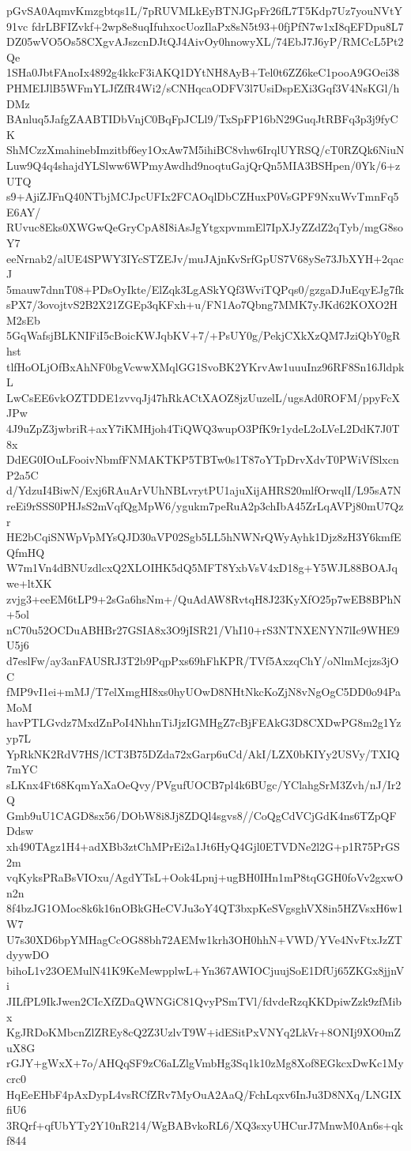 pGvSA0AqmvKmzgbtqs1L/7pRUVMLkEyBTNJGpFr26fL7T5Kdp7Uz7youNVtY91vc
fdrLBFIZvkf+2wp8e8uqIfuhxocUozIlaPx8sN5t93+0fjPfN7w1xI8qEFDpu8L7
DZ05wVO5Os58CXgvAJszcnDJtQJ4AivOy0hnowyXL/74EbJ7J6yP/RMCcL5Pt2Qe
1SHa0JbtFAnoIx4892g4kkcF3iAKQ1DYtNH8AyB+Tel0t6ZZ6keC1pooA9GOei38
PHMEIJlB5WFmYLJfZfR4Wi2/sCNHqcaODFV3l7UsiDspEXi3Gqf3V4NsKGl/hDMz
BAnluq5JafgZAABTIDbVnjC0BqFpJCLl9/TxSpFP16bN29GuqJtRBFq3p3j9fyCK
ShMCzzXmahinebImzitbf6ey1OxAw7M5ihiBC8vhw6IrqlUYRSQ/cT0RZQk6NiuN
Luw9Q4q4shajdYLSlww6WPmyAwdhd9noqtuGajQrQn5MIA3BSHpen/0Yk/6+zUTQ
s9+AjiZJFnQ40NTbjMCJpcUFIx2FCAOqlDbCZHuxP0VsGPF9NxuWvTmnFq5E6AY/
RUvuc8Eks0XWGwQeGryCpA8I8iAsJgYtgxpvmmEl7IpXJyZZdZ2qTyb/mgG8soY7
eeNrnab2/alUE4SPWY3IYcSTZEJv/muJAjnKvSrfGpUS7V68ySe73JbXYH+2qacJ
5mauw7dnnT08+PDsOyIkte/ElZqk3LgASkYQf3WviTQPqs0/gzgaDJuEqyEJg7fk
sPX7/3ovojtvS2B2X21ZGEp3qKFxh+u/FN1Ao7Qbng7MMK7yJKd62KOXO2HM2sEb
5GqWafsjBLKNIFiI5cBoicKWJqbKV+7/+PsUY0g/PekjCXkXzQM7JziQbY0gRhst
tlfHoOLjOfBxAhNF0bgVcwwXMqlGG1SvoBK2YKrvAw1uuuInz96RF8Sn16JldpkL
LwCsEE6vkOZTDDE1zvvqJj47hRkACtXAOZ8jzUuzelL/ugsAd0ROFM/ppyFcXJPw
4J9uZpZ3jwbriR+axY7iKMHjoh4TiQWQ3wupO3PfK9r1ydeL2oLVeL2DdK7J0T8x
DdEG0IOuLFooivNbmfFNMAKTKP5TBTw0s1T87oYTpDrvXdvT0PWiVfSlxcnP2a5C
d/YdzuI4BiwN/Exj6RAuArVUhNBLvrytPU1ajuXijAHRS20mlfOrwqlI/L95sA7N
reEi9rSSS0PHJsS2mVqfQgMpW6/ygukm7peRuA2p3chIbA45ZrLqAVPj80mU7Qzr
HE2bCqiSNWpVpMYsQJD30aVP02Sgb5LL5hNWNrQWyAyhk1Djz8zH3Y6kmfEQfmHQ
W7m1Vn4dBNUzdlcxQ2XLOIHK5dQ5MFT8YxbVsV4xD18g+Y5WJL88BOAJqwe+ltXK
zvjg3+eeEM6tLP9+2sGa6hsNm+/QuAdAW8RvtqH8J23KyXfO25p7wEB8BPhN+5ol
nC70u52OCDuABHBr27GSIA8x3O9jISR21/VhI10+rS3NTNXENYN7lIc9WHE9U5j6
d7eslFw/ay3anFAUSRJ3T2b9PqpPxs69hFhKPR/TVf5AxzqChY/oNlmMcjzs3jOC
fMP9vI1ei+mMJ/T7elXmgHI8xs0hyUOwD8NHtNkcKoZjN8vNgOgC5DD0o94PaMoM
havPTLGvdz7MxdZnPoI4NhhnTiJjzIGMHgZ7cBjFEAkG3D8CXDwPG8m2g1Yzyp7L
YpRkNK2RdV7HS/lCT3B75DZda72xGarp6uCd/AkI/LZX0bKIYy2USVy/TXIQ7mYC
sLKnx4Ft68KqmYaXaOeQvy/PVgufUOCB7pl4k6BUgc/YClahgSrM3Zvh/nJ/Ir2Q
Gmb9uU1CAGD8sx56/DObW8i8Jj8ZDQl4sgvs8//CoQgCdVCjGdK4ns6TZpQFDdsw
xh490TAgz1H4+adXBb3ztChMPrEi2a1Jt6HyQ4Gjl0ETVDNe2l2G+p1R75PrGS2m
vqKyksPRaBsVIOxu/AgdYTsL+Ook4Lpnj+ugBH0IHn1mP8tqGGH0foVv2gxwOn2n
8f4bzJG1OMoc8k6k16nOBkGHeCVJu3oY4QT3bxpKeSVgsghVX8in5HZVsxH6w1W7
U7s30XD6bpYMHagCcOG88bh72AEMw1krh3OH0hhN+VWD/YVe4NvFtxJzZTdyywDO
bihoL1v23OEMulN41K9KeMewpplwL+Yn367AWIOCjuujSoE1DfUj65ZKGx8jjnVi
JILfPL9IkJwen2CIcXfZDaQWNGiC81QvyPSmTVl/fdvdeRzqKKDpiwZzk9zfMibx
KgJRDoKMbcnZlZREy8cQ2Z3UzlvT9W+idESitPxVNYq2LkVr+8ONIj9XO0mZuX8G
rGJY+gWxX+7o/AHQqSF9zC6aLZlgVmbHg3Sq1k10zMg8Xof8EGkcxDwKc1Mycrc0
HqEeEHbF4pAxDypL4vsRCfZRv7MyOuA2AaQ/FchLqxv6InJu3D8NXq/LNGIXfiU6
3RQrf+qfUbYTy2Y10nR214/WgBABvkoRL6/XQ3sxyUHCurJ7MnwM0An6s+qkf844
